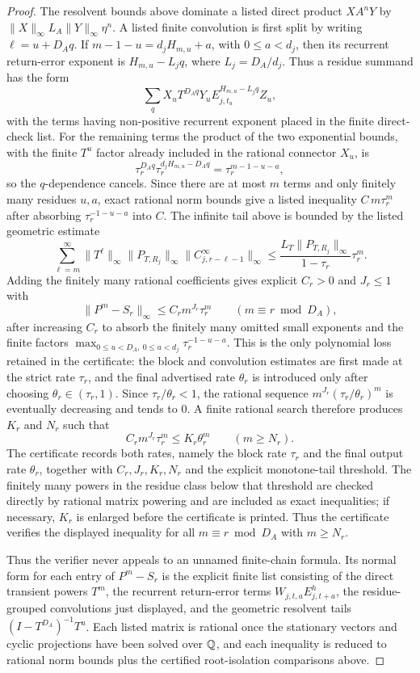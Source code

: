 \begin{proof}
  The resolvent bounds above dominate a listed direct product
  \(X A^n Y\) by
  \(\|X\|_\infty L_A\|Y\|_\infty\eta^n\). A listed finite convolution is
  first split by writing \(\ell=u+D_Aq\). If
  \(m-1-u=d_jH_{m,u}+a\), with \(0\le a<d_j\), then its recurrent
  return-error exponent is \(H_{m,u}-L_jq\), where
  \(L_j=D_A/d_j\). Thus a residue summand has the form
  \[
    \sum_q X_uT^{D_Aq}Y_uE_{j,t_u}^{H_{m,u}-L_jq}Z_u,
  \]
  with the terms having non-positive recurrent exponent placed in the
  finite direct-check list. For the remaining terms the product of the
  two exponential bounds, with the finite \(T^u\) factor already included
  in the rational connector \(X_u\), is
  \[
    \tau_r^{D_Aq}\tau_r^{d_jH_{m,u}-D_Aq}
      =\tau_r^{m-1-u-a},
  \]
  so the \(q\)-dependence cancels. Since there are at most \(m\) terms
  and only finitely many residues \(u,a\), exact rational norm bounds
  give a listed inequality \(C\,m\tau_r^m\) after absorbing
  \(\tau_r^{-1-u-a}\) into \(C\). The infinite tail above is bounded by the
  listed geometric estimate
  \[
    \sum_{\ell=m}^{\infty}
      \|T^\ell\|_\infty\|P_{T,R_j}\|_\infty
      \|C_{j,r-\ell-1}^{\infty}\|_\infty
    \le
    \frac{L_T\|P_{T,R_j}\|_\infty}{1-\tau_r}\tau_r^m .
  \]
  Adding the finitely many rational coefficients gives explicit
  \(C_r>0\) and \(J_r\le1\) with
  \[
    \|P^m-S_r\|_\infty\le C_rm^{J_r}\tau_r^m
    \qquad(m\equiv r\bmod D_A),
  \]
  after increasing \(C_r\) to absorb the finitely many omitted small
  exponents and the finite factors
  \(\max_{0\le u<D_A,\ 0\le a<d_j}\tau_r^{-1-u-a}\). This is the only
  polynomial loss retained in the certificate: the block and convolution
  estimates are first made at the strict rate \(\tau_r\), and the final
  advertised rate \(\theta_r\) is introduced only after choosing
  \(\theta_r\in(\tau_r,1)\). Since \(\tau_r/\theta_r<1\), the rational
  sequence \(m^{J_r}(\tau_r/\theta_r)^m\) is eventually decreasing and
  tends to \(0\). A finite rational search therefore produces \(K_r\)
  and \(N_r\) such that
  \[
    C_rm^{J_r}\tau_r^m\le K_r\theta_r^m
    \qquad(m\ge N_r).
  \]
  The certificate records both rates, namely the block rate \(\tau_r\)
  and the final output rate \(\theta_r\), together with
  \(C_r,J_r,K_r,N_r\) and the explicit monotone-tail threshold. The
  finitely many powers in the
  residue class below that threshold are checked directly by rational
  matrix powering and are included as exact inequalities; if necessary,
  \(K_r\) is enlarged before the certificate is printed. Thus the
  certificate verifies the displayed inequality for all
  \(m\equiv r\bmod D_A\) with \(m\ge N_r\).

  Thus the verifier never appeals to an unnamed finite-chain formula.
  Its normal form for each entry of \(P^m-S_r\) is the explicit finite
  list consisting of the direct transient powers \(T^m\), the recurrent
  return-error terms \(W_{j,t,a}E_{j,t+a}^h\), the residue-grouped
  convolutions just displayed, and the geometric resolvent tails
  \((I-T^{D_A})^{-1}T^u\). Each listed matrix is rational once the
  stationary vectors and cyclic projections have been solved over
  \(\mathbb{Q}\), and each inequality is reduced to rational norm bounds plus
  the certified root-isolation comparisons above.
\end{proof}
